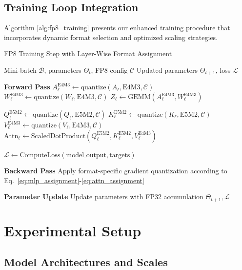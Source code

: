 \documentclass[conference]{IEEEtran}
\begin{document}
\subsection{Training Loop Integration}

Algorithm \ref{alg:fp8_training} presents our enhanced training procedure that incorporates dynamic format selection and optimized scaling strategies.

\begin{algorithm}[hbt!]
\caption{FP8 Training Step with Layer-Wise Format Assignment}
\label{alg:fp8_training}
\begin{algorithmic}
\Require Mini-batch $\mathcal{B}$, parameters $\Theta_t$, FP8 config $\mathcal{C}$
\Ensure Updated parameters $\Theta_{t+1}$, loss $\mathcal{L}$

\State \textbf{Forward Pass}
  \State $A_\ell^{\text{E4M3}} \gets \text{quantize}(A_{\ell}, \text{E4M3}, \mathcal{C})$
  \State $W_\ell^{\text{E4M3}} \gets \text{quantize}(W_{\ell}, \text{E4M3}, \mathcal{C})$
  \State $Z_\ell \gets \text{GEMM}(A_\ell^{\text{E4M3}}, W_\ell^{\text{E4M3}})$
\EndFor

  \State $Q_\ell^{\text{E5M2}} \gets \text{quantize}(Q_{\ell}, \text{E5M2}, \mathcal{C})$
  \State $K_\ell^{\text{E5M2}} \gets \text{quantize}(K_{\ell}, \text{E5M2}, \mathcal{C})$
  \State $V_\ell^{\text{E4M3}} \gets \text{quantize}(V_{\ell}, \text{E4M3}, \mathcal{C})$
  \State $\text{Attn}_\ell \gets \text{ScaledDotProduct}(Q_\ell^{\text{E5M2}}, K_\ell^{\text{E5M2}}, V_\ell^{\text{E4M3}})$
\EndFor

\State $\mathcal{L} \gets \text{ComputeLoss}(\text{model\_output}, \text{targets})$

\State \textbf{Backward Pass}
\State Apply format-specific gradient quantization according to Eq.~\ref{eq:mlp_assignment}-\ref{eq:attn_assignment}

\State \textbf{Parameter Update}
\State Update parameters with FP32 accumulation
\State \Return $\Theta_{t+1}, \mathcal{L}$
\end{algorithmic}
\end{algorithm}

\section{Experimental Setup}

\subsection{Model Architectures and Scales}
\end{document}
